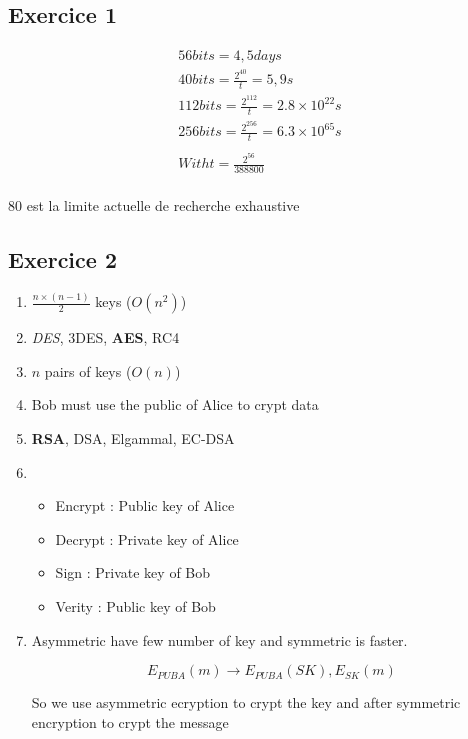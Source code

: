 
\subsection{Exercice 1}
\begin{eqnarray*}
    56 bits = 4,5 days \\
    40 bits = \frac{2^{40}}{t} = 5,9 s \\
    112 bits = \frac{2^{112}}{t} = 2.8 \times 10^{22} s \\
    256 bits = \frac{2^{256}}{t} = 6.3 \times 10^{65} s \\
    \\
    With t = \frac{2^{56}}{388 800} \\
\end{eqnarray*}

80 est la limite actuelle de recherche exhaustive

\subsection{Exercice 2}
\begin{enumerate}
    \item $\frac{n\times (n-1)}{2}$ keys   ($O(n^2)$)
    \item \textit{DES}, 3DES, \textbf{AES}, RC4

    \item $n$ pairs of keys  ($O(n)$)
    \item Bob must use the public of Alice to crypt data
    \item \textbf{RSA}, DSA, Elgammal, EC-DSA

    \item \begin{itemize}
            \item Encrypt : Public key of Alice
            \item Decrypt : Private key of Alice
            \item Sign    : Private key of Bob
            \item Verity  : Public key of Bob
        \end{itemize}

    \item Asymmetric have few number of key and symmetric is faster.

        $$E_{PUB A}(m) \to E_{PUB A}(SK), E_{SK}(m)$$

        So we use asymmetric ecryption to crypt the key and after
        symmetric encryption to crypt the message
\end{enumerate}


